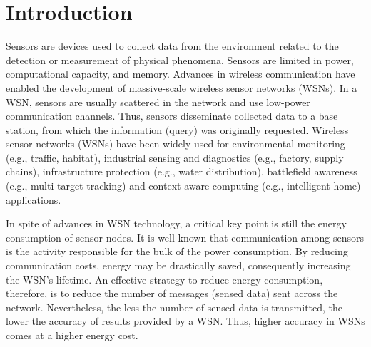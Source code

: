 \documentclass{acm_proc_article-sp}
\begin{document}



%



\section{Introduction}


Sensors are devices used to collect data from the environment related to the
detection or measurement of physical phenomena. Sensors are limited in power,
computational capacity, and memory. Advances in wireless communication have
enabled the development of massive-scale wireless sensor networks (WSNs). In a
WSN, sensors are usually scattered in the network and use low-power
communication channels. Thus, sensors disseminate collected data to a base
station, from which the information (query) was originally requested. Wireless
sensor networks (WSNs) have been widely used for environmental monitoring (e.g.,
traffic, habitat), industrial sensing and diagnostics (e.g., factory, supply
chains), infrastructure protection (e.g., water distribution), battlefield
awareness (e.g., multi-target tracking) and context-aware computing (e.g.,
intelligent home) applications.

In spite of advances in WSN technology, a critical key point is still the
energy consumption of sensor nodes. It is well known that communication among
sensors is the activity responsible for the bulk of the power consumption. By
reducing communication costs, energy may be drastically saved, consequently
increasing the WSN's lifetime. An effective strategy to reduce energy
consumption, therefore, is to reduce the number of messages (sensed data) sent
across the network. Nevertheless, the less the number of sensed data is transmitted,
the lower the accuracy of results provided by a WSN. Thus, higher accuracy in
WSNs comes at a higher energy cost.
\end{document}
